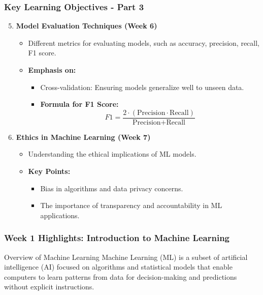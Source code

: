 \documentclass[aspectratio=169]{beamer}
\begin{document}
\begin{frame}
    \frametitle{Key Learning Objectives - Part 3}
    \begin{enumerate}
        \setcounter{enumi}{4} %
        
        \item \textbf{Model Evaluation Techniques (Week 6)}
        \begin{itemize}
            \item Different metrics for evaluating models, such as accuracy, precision, recall, F1 score.
            \item \textbf{Emphasis on:}
            \begin{itemize}
                \item Cross-validation: Ensuring models generalize well to unseen data.
                \item \textbf{Formula for F1 Score:}
                \begin{equation}
                F1 = \frac{2 \cdot (\text{Precision} \cdot \text{Recall})}{\text{Precision} + \text{Recall}}
                \end{equation}
            \end{itemize}
        \end{itemize}

        \item \textbf{Ethics in Machine Learning (Week 7)}
        \begin{itemize}
            \item Understanding the ethical implications of ML models.
            \item \textbf{Key Points:}
            \begin{itemize}
                \item Bias in algorithms and data privacy concerns.
                \item The importance of transparency and accountability in ML applications.
            \end{itemize}
        \end{itemize}
    \end{enumerate}
\end{frame}

\begin{frame}[fragile]
    \frametitle{Week 1 Highlights: Introduction to Machine Learning}
    \begin{block}{Overview of Machine Learning}
        Machine Learning (ML) is a subset of artificial intelligence (AI) focused on algorithms and statistical models that enable computers to learn patterns from data for decision-making and predictions without explicit instructions.
    \end{block}
\end{frame}
\end{document}
